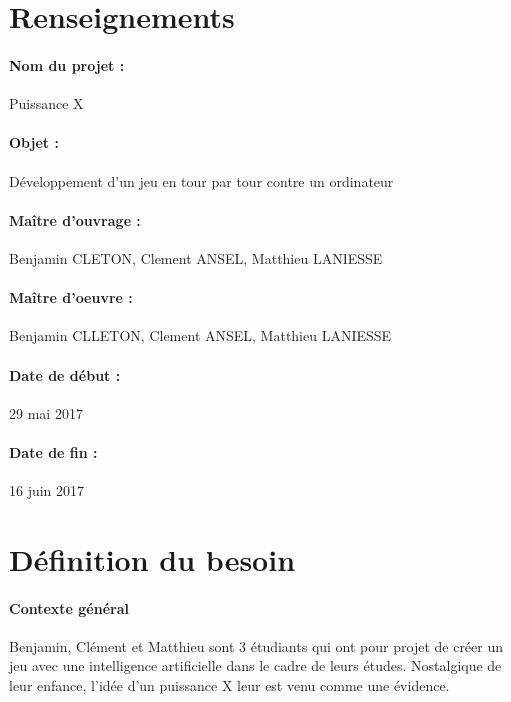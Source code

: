 \documentclass[a4paper,oneside]{article}
\title{\mytitle }
\author{Benjamin CLETON, Clement ANSEL et Matthieu LANIESSE}
\date{29 mai 2017}
\begin{document}
\maketitle

\thispagestyle{fancyplain}



\section{Renseignements}

\paragraph{Nom du projet :}
Puissance X

\paragraph{Objet :}
Développement d'un jeu en tour par tour contre un ordinateur

\paragraph{Maître d'ouvrage :}
Benjamin CLETON, Clement ANSEL, Matthieu LANIESSE

\paragraph{Maître d'oeuvre : }
Benjamin CLLETON, Clement ANSEL, Matthieu LANIESSE

\paragraph{Date de début :}
29 mai 2017

\paragraph{Date de fin :}
16 juin 2017



\newpage

\section{Définition du besoin}

\paragraph{Contexte général\\}
Benjamin, Clément et Matthieu sont 3 étudiants qui ont pour projet de créer un jeu avec une intelligence artificielle dans le cadre de leurs études.
Nostalgique de leur enfance, l'idée d'un puissance X leur est venu comme une évidence.
\end{document}
